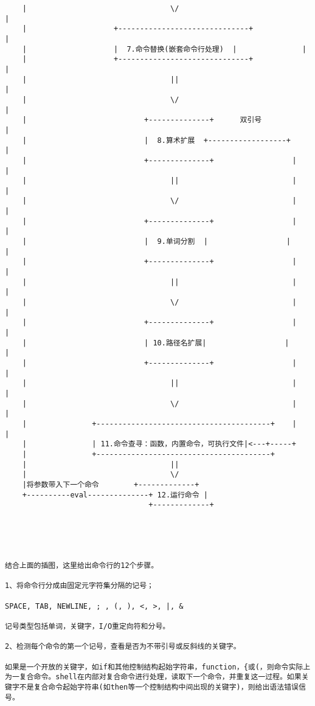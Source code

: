 \begin{lstlisting}
    |                                 \/                                |
    |                    +------------------------------+               |
    |                    |  7.命令替换(嵌套命令行处理)  |               |
    |                    +------------------------------+               |
    |                                 ||                                |
    |                                 \/                                |
    |                           +--------------+      双引号            |
    |                           |  8.算术扩展  +------------------+     |
    |                           +--------------+                  |     |
    |                                 ||                          |     |
    |                                 \/                          |     |
    |                           +--------------+                  |     |
    |                           |  9.单词分割  |                  |     |
    |                           +--------------+                  |     |
    |                                 ||                          |     |
    |                                 \/                          |     |
    |                           +--------------+                  |     |
    |                           | 10.路径名扩展|                  |     |
    |                           +--------------+                  |     |
    |                                 ||                          |     |
    |                                 \/                          |     |
    |               +----------------------------------------+    |     |
    |               | 11.命令查寻：函数，内置命令，可执行文件|<---+-----+
    |               +----------------------------------------+
    |                                 ||
    |                                 \/
    |将参数带入下一个命令        +-------------+
    +----------eval--------------+ 12.运行命令 |
                                 +-------------+





结合上面的插图，这里给出命令行的12个步骤。

1、将命令行分成由固定元字符集分隔的记号；

SPACE, TAB, NEWLINE, ; , (, ), <, >, |, &

记号类型包括单词，关键字，I/O重定向符和分号。

2、检测每个命令的第一个记号，查看是否为不带引号或反斜线的关键字。

如果是一个开放的关键字，如if和其他控制结构起始字符串，function，{或(，则命令实际上为一复合命令。shell在内部对复合命令进行处理，读取下一个命令，并重复这一过程。如果关键字不是复合命令起始字符串(如then等一个控制结构中间出现的关键字)，则给出语法错误信号。


\end{lstlisting}
